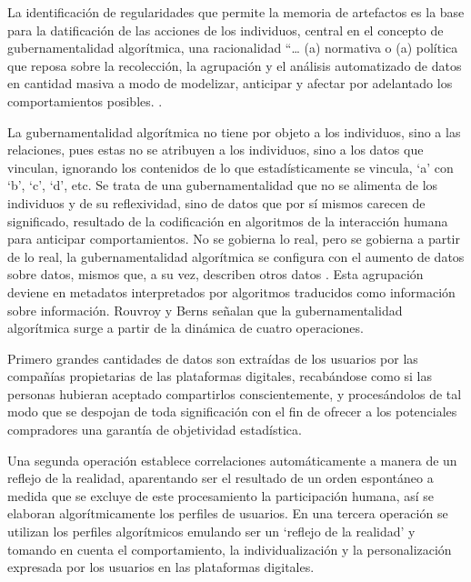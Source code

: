 \documentclass[
  spanish,
  11pt,
  a4paper,
]{scrbook}
\begin{document}
La identificación de regularidades que permite la memoria de artefactos
es la base para la datificación de las acciones de los individuos,
central en el concepto de gubernamentalidad algorítmica, una
racionalidad ``\ldots{} (a) normativa o (a) política que reposa sobre la
recolección, la agrupación y el análisis automatizado de datos en
cantidad masiva a modo de modelizar, anticipar y afectar por adelantado
los comportamientos posibles. \autocite[98]{Rouvroy2016}.

La gubernamentalidad algorítmica no tiene por objeto a los individuos,
sino a las relaciones, pues estas no se atribuyen a los individuos, sino
a los datos que vinculan, ignorando los contenidos de lo que
estadísticamente se vincula, `a' con `b', `c', `d', etc. Se trata de una
gubernamentalidad que no se alimenta de los individuos y de su
reflexividad, sino de datos que por sí mismos carecen de significado,
resultado de la codificación en algoritmos de la interacción humana para
anticipar comportamientos. No se gobierna lo real, pero se gobierna a
partir de lo real, la gubernamentalidad algorítmica se configura con el
aumento de datos sobre datos, mismos que, a su vez, describen otros
datos \autocite[107]{Rouvroy2016}. Esta agrupación deviene en metadatos
interpretados por algoritmos traducidos como información sobre
información. Rouvroy y Berns señalan que la gubernamentalidad
algorítmica surge a partir de la dinámica de cuatro operaciones.

Primero grandes cantidades de datos son extraídas de los usuarios por
las compañías propietarias de las plataformas digitales, recabándose
como si las personas hubieran aceptado compartirlos conscientemente, y
procesándolos de tal modo que se despojan de toda significación con el
fin de ofrecer a los potenciales compradores una garantía de objetividad
estadística.

Una segunda operación establece correlaciones automáticamente a manera
de un reflejo de la realidad, aparentando ser el resultado de un orden
espontáneo a medida que se excluye de este procesamiento la
participación humana, así se elaboran algorítmicamente los perfiles de
usuarios. En una tercera operación se utilizan los perfiles algorítmicos
emulando ser un `reflejo de la realidad' y tomando en cuenta el
comportamiento, la individualización y la personalización expresada por
los usuarios en las plataformas digitales.
\end{document}
